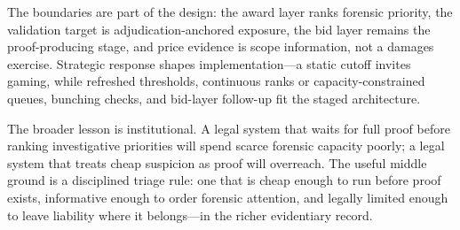 The boundaries are part of the design: the award layer ranks
forensic priority, the validation target is adjudication-anchored
exposure, the bid layer remains the proof-producing stage, and
price evidence is scope information, not a damages exercise.
Strategic response shapes implementation---a static cutoff
invites gaming, while refreshed thresholds, continuous ranks or
capacity-constrained queues, bunching checks, and bid-layer
follow-up fit the staged architecture.

The broader lesson is institutional. A legal system that waits
for full proof before ranking investigative priorities will
spend scarce forensic capacity poorly; a legal system that
treats cheap suspicion as proof will overreach. The useful
middle ground is a disciplined triage rule: one that is cheap
enough to run before proof exists, informative enough to order
forensic attention, and legally limited enough to leave
liability where it belongs---in the richer evidentiary record.

